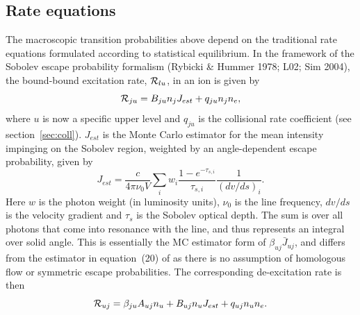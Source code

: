 \subsection{Rate equations}

The macroscopic transition probabilities above depend on the traditional
rate equations formulated according to statistical equilibrium. 
In the framework of the Sobolev escape probability formalism 
(Rybicki \& Hummer 1978; L02; Sim 2004), 
the bound-bound excitation rate, ${\cal R}_{lu}$, in an ion is given by 
\begin{equation}
{\cal R}_{ju} = B_{ju} n_j J_{est} + q_{ju} n_j n_e,
\label{eq:rad_rate}
\end{equation}
where $u$ is now a specific upper level and $q_{ju}$ is the collisional
rate coefficient (see section~\ref{sec:coll}).
$J_{est}$ is the Monte Carlo estimator for the mean intensity 
impinging on the Sobolev region, weighted by an angle-dependent escape probability, 
given by \citep{sim2004}
\begin{equation}
J_{est} = \frac{c}{4 \pi \nu_0 V} \sum_{i} w_i \frac{1 - e^{-\tau_{s,i}}}{\tau_{s,i}} \frac{1}{(dv/ds)_i}.
\end{equation}
Here $w$ is the photon weight (in luminosity units), $\nu_0$
is the line frequency, $dv/ds$ is the velocity gradient and
$\tau_s$ is the Sobolev optical depth.
The sum is over all photons that come into resonance with the line,
and thus represents an integral over solid angle.
This is essentially the MC estimator form of $\beta_{uj}\bar{J}_{uj}$, and differs
from the estimator in equation~(20) of \cite{lucy2002} as 
there is no assumption of homologous flow or symmetric escape probabilities.
The corresponding de-excitation rate is then 
\begin{equation}
{\cal R}_{uj} = \beta_{ju} A_{uj} n_u + B_{uj} n_u J_{est} +
q_{uj} n_u n_e.
\label{eq:nlte_rul}
\end{equation}

